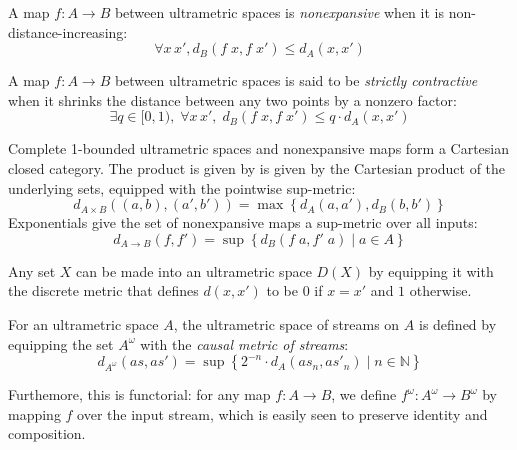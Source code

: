 \documentclass[nocopyrightspace,preprint]{sigplanconf}
\newcommand{\N}{\mathbb{N}}
\newcommand{\setof}[1]{\left\{{#1}\right\}}
\newcommand{\comprehend}[2]{\setof{{#1}\;|\;{#2}}}
\begin{document}
A map $f : A \to B$ between ultrametric spaces is \emph{nonexpansive} when 
it is non-distance-increasing:
\begin{displaymath}
  \forall x\, x', d_B(f\;x, f\;x') \leq d_A(x, x')
\end{displaymath}

A map $f : A \to B$ between ultrametric spaces is said to be
\emph{strictly contractive} when it shrinks the distance between 
any two points by a nonzero factor:
\begin{displaymath}
  \exists q \in [0,1),\;\forall x\, x',\; d_B(f\;x, f\;x') \leq q \cdot d_A(x, x')
\end{displaymath}

Complete 1-bounded ultrametric spaces and nonexpansive maps form a 
Cartesian closed category. The product is given by
is given by the Cartesian product of the underlying sets, equipped with the pointwise sup-metric:
\begin{displaymath}
  d_{A \times B}((a,b), (a',b')) = \max \setof{d_A(a,a'), d_B(b,b')}
\end{displaymath}
Exponentials give the set of nonexpansive maps a sup-metric over all inputs:
\begin{displaymath}
  d_{A \to B}(f, f') = \sup \comprehend{d_B(f\;a,f'\;a)}{a \in A}
\end{displaymath}

Any set $X$ can be made into an ultrametric space $D(X)$ by
equipping it with the discrete metric that defines $d(x,x')$ to be $0$ if $x=x'$ and $1$ otherwise.


For an ultrametric space $A$, the ultrametric space of
streams on $A$ is defined by equipping the set $A^\omega$ with 
the \emph{causal metric of streams}:
\begin{displaymath}
  d_{A^\omega}(as, as') = \sup \comprehend{2^{-n}\cdot d_A(as_n, as'_n)}{n \in \N}
\end{displaymath}

\noindent Furthemore, this is functorial: for any map $f : A \to B$, 
we define $f^\omega : A^\omega \to B^\omega$ by mapping $f$ over the input stream, which is easily seen to preserve identity and composition.
\end{document}
